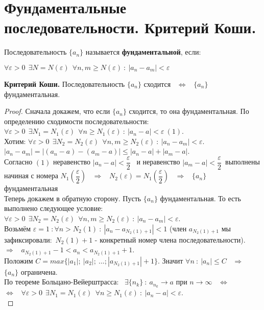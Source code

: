 \documentclass[12pt]{article}
\begin{document}
\section{Фундаментальные последовательности. Критерий Коши.}
Последовательность $\{a_n\}$ называется \textbf{фундаментальной}, если:
\begin{center}
    $\forall \varepsilon > 0 \ \ \exists N = N(\varepsilon)  \ \ \forall n, m \geq N(\varepsilon) \ : \ |a_n - a_m| < \varepsilon$ 
\end{center}
\textbf{Критерий Коши.} Последовательность $\{a_n\}$ сходится \ $\Leftrightarrow$ \  $\{a_n\}$ фундаментальная.
\begin{proof}
    Сначала докажем, что если $\{a_n\}$ сходится, то она фундаментальная. По определению сходимости последовательности: $\forall \varepsilon > 0 \ \ \exists N_1 = N_1(\varepsilon) \ \ \forall n \geq N_1(\varepsilon) \ : \ |a_n - a| < \varepsilon \ (1)$. \\
    Хотим: $\forall \varepsilon > 0 \ \ \exists N_2 = N_2(\varepsilon) \ \ \forall n, m \geq N_2(\varepsilon) \ : \ |a_n - a_m| < \varepsilon$. \\
    $|a_n - a_m| = |(a_n - a) - (a_m - a)| \leq |a_n - a| + |a_m - a|$. \\ Согласно $(1)$ неравенство $|a_n - a| < \dfrac{\varepsilon}{2}$ \ и неравенство $|a_m - a| < \dfrac{\varepsilon}{2}$\ выполнены начиная с номера $N_1\left(\dfrac{\varepsilon}{2}\right)$ \ $\Rightarrow$ \ $N_2(\varepsilon) = N_1\left(\dfrac{\varepsilon}{2}\right)$  \ $\Rightarrow$ \ $\{a_n\}$ фундаментальная\\
    Теперь докажем в обратную сторону. Пусть $\{a_n\}$ фундаментальная. То есть выполнено следующее условие: $\forall \varepsilon > 0 \ \ \exists N_2 = N_2(\varepsilon) \ \ \forall n, m \geq N_2(\varepsilon) \ : \ |a_n - a_m| < \varepsilon$. \\
    Возьмём $\varepsilon = 1 \ : \forall n > N_2(1) \ : \ |a_n - a_{N_2(1)+1}| < 1$ (член $a_{N_2(1)+1}$ мы зафиксировали:\ $N_2(1)+1$ - конкретный номер члена последовательности). \ $\Rightarrow$ \ $a_{N_2(1)+1} - 1 < a_n < a_{N_2(1)+1} + 1$. \\
    Положим $C = max\{|a_1|; \ |a_2|; \ ...; |a_{N_2(1)+1}| + 1 \}$. Значит $\forall n \ : \ |a_n| \leq C$ \ $\Rightarrow$ \ $\{a_n\}$ ограничена.\\
    По теореме Больцано-Вейерштрасса: \ $\exists \{n_k\} \ : \ a_{n_k} \to a$ при $n \to \infty$ \ $\Leftrightarrow$ \\ $\Leftrightarrow$ \ $\forall \varepsilon > 0 \ \ \exists N_1 = N_1(\varepsilon) \ \ \forall n \geq N_1(\varepsilon) \ : \ |a_n - a| < \varepsilon$. \\

\end{proof}
\end{document}

